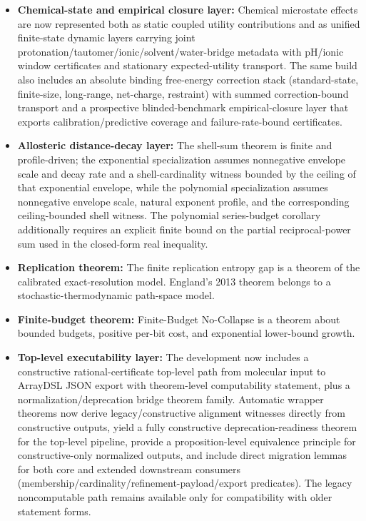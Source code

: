 \begin{itemize}
	\item \textbf{Chemical-state and empirical closure layer:} Chemical microstate effects are now represented both as static coupled utility contributions and as unified finite-state dynamic layers carrying joint protonation/tautomer/ionic/solvent/water-bridge metadata with pH/ionic window certificates and stationary expected-utility transport. The same build also includes an absolute binding free-energy correction stack (standard-state, finite-size, long-range, net-charge, restraint) with summed correction-bound transport and a prospective blinded-benchmark empirical-closure layer that exports calibration/predictive coverage and failure-rate-bound certificates.
	\item \textbf{Allosteric distance-decay layer:} The shell-sum theorem is finite and profile-driven; the exponential specialization assumes nonnegative envelope scale and decay rate and a shell-cardinality witness bounded by the ceiling of that exponential envelope, while the polynomial specialization assumes nonnegative envelope scale, natural exponent profile, and the corresponding ceiling-bounded shell witness. The polynomial series-budget corollary additionally requires an explicit finite bound on the partial reciprocal-power sum used in the closed-form real inequality.
	\item \textbf{Replication theorem:} The finite replication entropy gap is a theorem of the calibrated exact-resolution model. England's 2013 theorem belongs to a stochastic-thermodynamic path-space model.
	\item \textbf{Finite-budget theorem:} Finite-Budget No-Collapse is a theorem about bounded budgets, positive per-bit cost, and exponential lower-bound growth.
	\item \textbf{Top-level executability layer:} The development now includes a constructive rational-certificate top-level path from molecular input to ArrayDSL JSON export with theorem-level computability statement, plus a normalization/deprecation bridge theorem family. Automatic wrapper theorems now derive legacy/constructive alignment witnesses directly from constructive outputs, yield a fully constructive deprecation-readiness theorem for the top-level pipeline, provide a proposition-level equivalence principle for constructive-only normalized outputs, and include direct migration lemmas for both core and extended downstream consumers (membership/cardinality/refinement-payload/export predicates). The legacy noncomputable path remains available only for compatibility with older statement forms.

\end{itemize}
